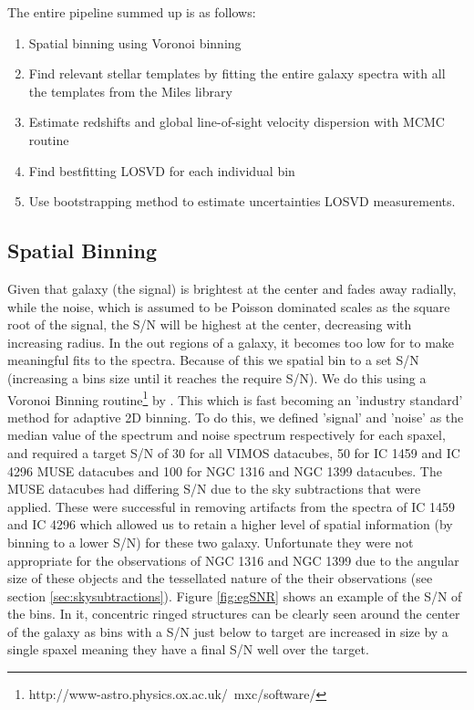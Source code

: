 	The entire pipeline summed up is as follows:
	\begin{enumerate}
		\item Spatial binning using Voronoi binning
		\item Find relevant stellar templates by fitting the entire galaxy spectra with all the templates from the Miles library
		\item Estimate redshifts and global line-of-sight velocity dispersion with MCMC routine 
		\item Find bestfitting LOSVD for each individual bin
		\item Use bootstrapping method to estimate uncertainties LOSVD measurements. 
	\end{enumerate}





	\subsection{Spatial Binning}
		Given that galaxy (the signal) is brightest at the center and fades away radially, while the noise, which is assumed to be Poisson dominated scales as the square root of the signal, the S/N will be highest at the center, decreasing with increasing radius. In the out regions of a galaxy, it becomes too low for to make meaningful fits to the spectra. Because of this we spatial bin to a set S/N (increasing a bins size until it reaches the require S/N). We do this using a Voronoi Binning routine\footnote{http://www-astro.physics.ox.ac.uk/~mxc/software/} by \citet{Cappellari2003}. This  which is fast becoming an 'industry standard' method for adaptive 2D binning. To do this, we defined 'signal' and 'noise' as the median value of the spectrum and noise spectrum respectively for each spaxel, and required a target S/N of 30 for all VIMOS datacubes, 50 for IC 1459 and IC 4296 MUSE datacubes and 100 for NGC 1316 and NGC 1399 datacubes. The MUSE datacubes had differing S/N due to the sky subtractions that were applied. These were successful in removing artifacts from the spectra of IC 1459 and IC 4296 which allowed us to retain a higher level of spatial information (by binning to a lower S/N) for these two galaxy. Unfortunate they were not appropriate for the observations of NGC 1316 and NGC 1399 due to the angular size of these objects and the tessellated nature of the their observations (see section \ref{sec:skysubtractions}). Figure \ref{fig:egSNR} shows an example of the S/N of the bins. In it, concentric ringed structures can be clearly seen around the center of the galaxy as bins with a S/N just below to target are increased in size by a single spaxel meaning they have a final S/N well over the target.


